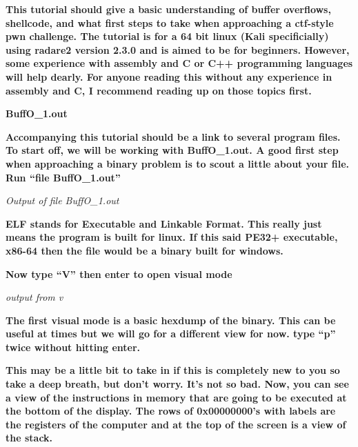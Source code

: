 \documentclass[letterpaper]{article}
\newcommand{\sitfig}[3]{
\begin{figure}[H]
\centering
\makebox[\textwidth][c]{
#2
}
\label{#1}
\end{figure}
}
\newcommand{\sitgfx}[4][scale=1.0]{
\sitfig{#3}{\texttt{[image: \#2]}}{#4}
}
\begin{document}
\textbf{This tutorial should give a basic understanding of buffer overflows, shellcode, and what first steps to take
when approaching a ctf-style pwn challenge. The tutorial is for a 64 bit linux (Kali specificially) using radare2
version 2.3.0 and is aimed to be for beginners. However, some experience with assembly and C or C++ programming
languages will help dearly. For anyone reading this without any experience in assembly and C, I recommend reading up on
those topics first.}

\textbf{BuffO\_1.out}

\textbf{Accompanying this tutorial should be a link to several program files. To start off, we will be working with
BuffO\_1.out. A good first step when approaching a binary problem is to scout a little about your file. Run ``file
BuffO\_1.out''}

  
\sitgfx[width=5.8335in,height=0.7665in]{reversing-img073.png}{fig:unk}{TODO CAPTION}
 

\textit{Output of file BuffO\_1.out}

\textbf{ELF stands for Executable and Linkable Format. This really just means the program is built for linux. If this
said PE32+ executable, x86-64 then the file would be a binary built for windows.}

  
\sitgfx[width=5.8335in,height=0.9602in]{reversing-img074.png}{fig:unk}{TODO CAPTION}
 

  
\sitgfx[width=5.8335in,height=3.6457in]{reversing-img075.png}{fig:unk}{TODO CAPTION}
 

\textbf{Now type ``V'' then enter to open visual mode}

  
\sitgfx[width=5.8335in,height=3.6457in]{reversing-img076.png}{fig:unk}{TODO CAPTION}
 

\textit{output from v}

\textbf{The first visual mode is a basic hexdump of the binary. This can be useful at times but we will go for a
different view for now. type ``p'' twice without hitting enter.}

  
\sitgfx[width=5.8335in,height=3.6457in]{reversing-img077.png}{fig:unk}{TODO CAPTION}
 

\textbf{This may be a little bit to take in if this is completely new to you so take a deep breath, but don't worry.
It's not so bad. Now, you can see a view of the instructions in memory that are going to be executed at the bottom of
the display. The rows of 0x00000000's with labels are the registers of the computer and at the top of the screen is a
view of the stack.}
\end{document}

